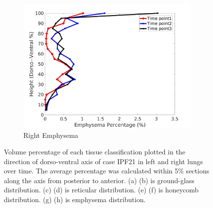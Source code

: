 \begin{figure}[H]
\begin{subfigure}{.42\linewidth}
  \includegraphics[width=\linewidth,trim={{.0\wd0} {.0\wd0} {.0\wd0} {.0\wd0}},clip]{Appendix/Image_AppexA/DorsoToVentral/IPF21RightLungEmphysemaDiseaseDorsoToVentral.jpg}
  \caption{Right Emphysema}
  \label{fig:IPF21DiseaseDorsoToVentral-h}
\end{subfigure}
\caption{Volume percentage of each tissue classification plotted in the direction of dorso-ventral axis of case IPF21 in left and right lungs over time. The average percentage was calculated within 5\% sections along the axis from posterior to anterior. (a) (b) is ground-glass distribution. (c) (d) is reticular distribution. (e) (f) is honeycomb distribution. (g) (h) is emphysema distribution.}
\label{fig:IPF21DiseaseDorsoToVentral}
\end{figure}


